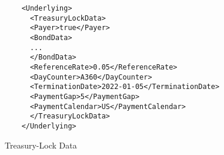\begin{listing}[H]
  \begin{verbatim}
    <Underlying>
      <TreasuryLockData>
      <Payer>true</Payer>
      <BondData>
      ...
      </BondData>
      <ReferenceRate>0.05</ReferenceRate>
      <DayCounter>A360</DayCounter>
      <TerminationDate>2022-01-05</TerminationDate>
      <PaymentGap>5</PaymentGap>
      <PaymentCalendar>US</PaymentCalendar>
      </TreasuryLockData>
    </Underlying>
\end{verbatim}
\caption{Treasury-Lock Data}
\label{lst:tlock_data}
\end{listing}
